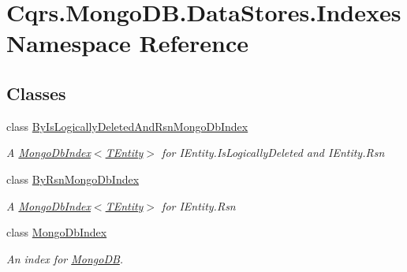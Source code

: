 \hypertarget{namespaceCqrs_1_1MongoDB_1_1DataStores_1_1Indexes}{}\section{Cqrs.\+Mongo\+D\+B.\+Data\+Stores.\+Indexes Namespace Reference}
\label{namespaceCqrs_1_1MongoDB_1_1DataStores_1_1Indexes}
\subsection*{Classes}
\begin{DoxyCompactItemize}
\item 
class \hyperlink{classCqrs_1_1MongoDB_1_1DataStores_1_1Indexes_1_1ByIsLogicallyDeletedAndRsnMongoDbIndex}{By\+Is\+Logically\+Deleted\+And\+Rsn\+Mongo\+Db\+Index}
\begin{DoxyCompactList}\small\item\em A \hyperlink{classCqrs_1_1MongoDB_1_1DataStores_1_1Indexes_1_1MongoDbIndex_a61f4b17dd968f92e81562c70ae062a89_a61f4b17dd968f92e81562c70ae062a89}{Mongo\+Db\+Index$<$\+T\+Entity$>$} for I\+Entity.\+Is\+Logically\+Deleted and I\+Entity.\+Rsn \end{DoxyCompactList}\item 
class \hyperlink{classCqrs_1_1MongoDB_1_1DataStores_1_1Indexes_1_1ByRsnMongoDbIndex}{By\+Rsn\+Mongo\+Db\+Index}
\begin{DoxyCompactList}\small\item\em A \hyperlink{classCqrs_1_1MongoDB_1_1DataStores_1_1Indexes_1_1MongoDbIndex_a61f4b17dd968f92e81562c70ae062a89_a61f4b17dd968f92e81562c70ae062a89}{Mongo\+Db\+Index$<$\+T\+Entity$>$} for I\+Entity.\+Rsn \end{DoxyCompactList}\item 
class \hyperlink{classCqrs_1_1MongoDB_1_1DataStores_1_1Indexes_1_1MongoDbIndex}{Mongo\+Db\+Index}
\begin{DoxyCompactList}\small\item\em An index for \hyperlink{namespaceCqrs_1_1MongoDB}{Mongo\+DB}. \end{DoxyCompactList}\end{DoxyCompactItemize}
